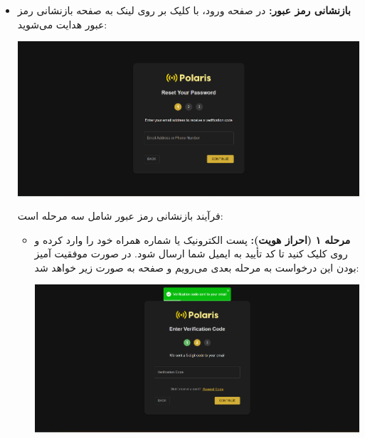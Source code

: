 \begin{itemize}
    	\item \textbf{بازنشانی رمز عبور:}  
    	در صفحه ورود، با کلیک بر روی لینک  به صفحه بازنشانی رمز عبور هدایت می‌شوید:
	    	\begin{center}
	    		\includegraphics[width=\textwidth]{images/fr-reset-pass-empty.png}
	    	\end{center}
    	فرآیند بازنشانی رمز عبور شامل سه مرحله است:
    	\begin{itemize}
    		\item \textbf{مرحله ۱ (احراز هویت):}  
    		پست الکترونیک یا شماره همراه خود را وارد کرده و روی  کلیک کنید تا کد تأیید به ایمیل شما ارسال شود. در صورت موفقیت آمیز بودن این درخواست به مرحله بعدی می‌رویم و صفحه به صورت زیر خواهد شد:
    			\begin{center}
    				\includegraphics[width=\textwidth]{images/fr-verification-empty.png}
    			\end{center}
    		

\end{itemize}
\end{itemize}
